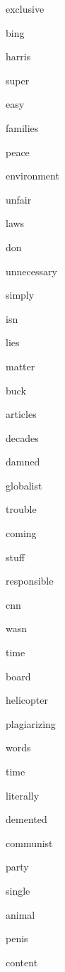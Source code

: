 \documentclass[varwidth]{standalone}
\begin{document}
\begin{CJK*}{UTF8}{gbsn}
{{{\colorbox{red!8.280939102172852}{\strut exclusive}
\colorbox{red!10.425168991088867}{\strut bing}
\colorbox{red!8.843046188354492}{\strut harris}
\colorbox{red!7.212615966796875}{\strut super}
\colorbox{red!10.815816879272461}{\strut easy}
\colorbox{red!8.342890739440918}{\strut families}
\colorbox{red!10.35930061340332}{\strut peace}
\colorbox{red!12.772064208984375}{\strut environment}
\colorbox{red!8.070019721984863}{\strut unfair}
\colorbox{red!7.269240379333496}{\strut laws}
\colorbox{red!5.859163284301758}{\strut don}
\colorbox{red!7.388310432434082}{\strut unnecessary}
\colorbox{red!8.437862396240234}{\strut simply}
\colorbox{red!7.214099884033203}{\strut isn}
\colorbox{red!8.141822814941406}{\strut lies}
\colorbox{red!11.259840965270996}{\strut matter}
\colorbox{red!8.476607322692871}{\strut buck}
\colorbox{red!9.325737953186035}{\strut articles}
\colorbox{red!7.1176605224609375}{\strut decades}
\colorbox{red!5.06855583190918}{\strut damned}
\colorbox{red!8.735294342041016}{\strut globalist}
\colorbox{red!5.89597225189209}{\strut trouble}
\colorbox{red!4.725156784057617}{\strut coming}
\colorbox{red!6.707021713256836}{\strut stuff}
\colorbox{red!8.853245735168457}{\strut responsible}
\colorbox{red!8.2178373336792}{\strut cnn}
\colorbox{red!4.242473602294922}{\strut wasn}
\colorbox{red!7.357840538024902}{\strut time}
\colorbox{red!8.16482162475586}{\strut board}
\colorbox{red!7.507626533508301}{\strut helicopter}
\colorbox{red!9.90312385559082}{\strut plagiarizing}
\colorbox{red!5.235369682312012}{\strut words}
\colorbox{red!7.241410255432129}{\strut time}
\colorbox{red!9.942708015441895}{\strut literally}
\colorbox{red!6.830680847167969}{\strut demented}
\colorbox{red!2.9931488037109375}{\strut communist}
\colorbox{red!9.492987632751465}{\strut party}
\colorbox{red!7.181933403015137}{\strut single}
\colorbox{red!10.346353530883789}{\strut animal}
\colorbox{red!7.4706034660339355}{\strut penis}
\colorbox{red!8.929338455200195}{\strut content}

}}}
\end{CJK*}
\end{document}
